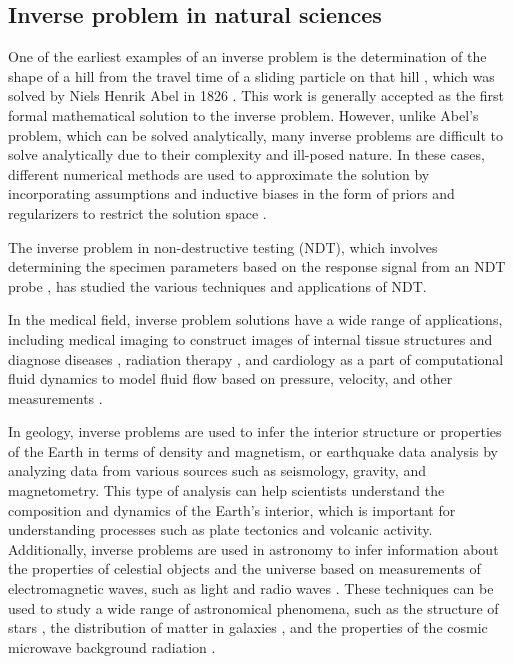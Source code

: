 \subsection{Inverse problem in natural sciences}
One of the earliest examples of an inverse problem is the determination of the shape of a hill from the travel time of a sliding particle on that hill \cite{JournalFurReine}, which was solved by Niels Henrik Abel in 1826 \cite{abazarInverseOptimalControl2020, kellerInverseProblems1976, yamanSurveyInverseProblems2013, groetschIntegralEquationsFirst2007}. This work is generally accepted as the first formal mathematical solution to the inverse problem. However, unlike Abel's problem, which can be solved analytically, many inverse problems are difficult to solve analytically due to their complexity and ill-posed nature. In these cases, different numerical methods are used to approximate the solution by incorporating assumptions and inductive biases in the form of priors and regularizers to restrict the solution space \cite{Jin2010HierarchicalBI, De2007Inverse, Haber2008NumericalMF}.

The inverse problem in non-destructive testing (NDT), which involves determining the specimen parameters based on the response signal from an NDT probe \cite{Udpa1986ADO, Bilicz2012Solution, Blitz1983Nondestructive, Langenberg1997Applied, RNondestructive}, has studied the various techniques and applications of NDT.

In the medical field, inverse problem solutions have a wide range of applications, including medical imaging to construct images of internal tissue structures and diagnose diseases \cite{Aghajani2013ultrasound, Burger2013Inverse, Monard2012Taming, NINVERSE, SComputational, Senouf2019Self, songSolvingInverseProblems2022}, radiation therapy \cite{Alfonso2012class, Bertuzzi2012Optimal, BumanApplications, Hindi2013tutorial, Jalalimanesh2017Multi}, and cardiology as a part of computational fluid dynamics to model fluid flow based on pressure, velocity, and other measurements \cite{Cotter2009Bayesian, Fernandez2013Some, Fourestey2005Solving, Gregson2015Applications, Imanuvilov2020Inverse}.

In geology, inverse problems are used to infer the interior structure or properties of the Earth in terms of density and magnetism, or earthquake data analysis \cite{Barhen2000Optimization, HInverse, Kim2018Geophysical} by analyzing data from various sources such as seismology, gravity, and magnetometry. This type of analysis can help scientists understand the composition and dynamics of the Earth's interior, which is important for understanding processes such as plate tectonics and volcanic activity.
Additionally, inverse problems are used in astronomy to infer information about the properties of celestial objects and the universe based on measurements of electromagnetic waves, such as light and radio waves \cite{Brown1995InversePI}. These techniques can be used to study a wide range of astronomical phenomena, such as the structure of stars \cite{Bellinger2018InversePI, Tsui2006DeterminationOT}, the distribution of matter in galaxies \cite{Daza2020RelationshipBR, Lanusse2013ImagingDM}, and the properties of the cosmic microwave background radiation \cite{Lassas2015OnTI, Lassas2017OnTI}.

